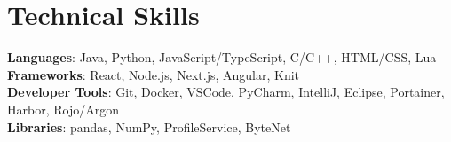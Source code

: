 \documentclass[letterpaper,11pt]{article}
\begin{document}
\section{Technical Skills}
 \begin{itemize}[leftmargin=0.15in, label={}]
    \small{\item{
     \textbf{Languages}{: Java, Python, JavaScript/TypeScript, C/C++, HTML/CSS, Lua} \\
     \textbf{Frameworks}{: React, Node.js, Next.js, Angular, Knit} \\
     \textbf{Developer Tools}{: Git, Docker, VSCode, PyCharm, IntelliJ, Eclipse, Portainer, Harbor, Rojo/Argon} \\
     \textbf{Libraries}{: pandas, NumPy, ProfileService, ByteNet}
    }}
 \end{itemize}
%
\end{document}
